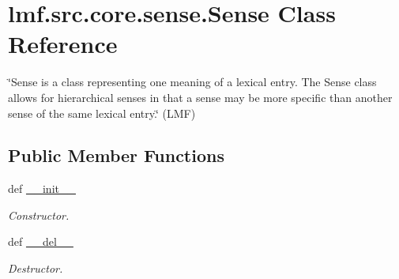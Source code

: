\hypertarget{classlmf_1_1src_1_1core_1_1sense_1_1_sense}{\section{lmf.\+src.\+core.\+sense.\+Sense Class Reference}
\label{classlmf_1_1src_1_1core_1_1sense_1_1_sense}
}


\char`\"{}\+Sense is a class representing one meaning of a lexical entry. The Sense class allows for hierarchical senses in that a sense may be more specific than another sense of the same lexical entry.\char`\"{} (L\+M\+F)  


\subsection*{Public Member Functions}
\begin{DoxyCompactItemize}
\item 
def \hyperlink{classlmf_1_1src_1_1core_1_1sense_1_1_sense_af0279b132d98c7b49141350ce34ea53b}{\+\_\+\+\_\+init\+\_\+\+\_\+}
\begin{DoxyCompactList}\small\item\em Constructor. \end{DoxyCompactList}\item 
def \hyperlink{classlmf_1_1src_1_1core_1_1sense_1_1_sense_a3cc439d56624626aaec6588dbcad5b58}{\+\_\+\+\_\+del\+\_\+\+\_\+}
\begin{DoxyCompactList}\small\item\em Destructor. \end{DoxyCompactList}\end{DoxyCompactItemize}
